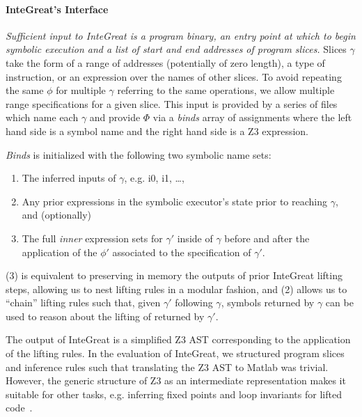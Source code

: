 \paragraph{InteGreat's Interface}

\emph{Sufficient input to InteGreat is a program binary, an entry point at which to begin symbolic execution and a list of start and end addresses of program slices.} 
Slices $\gamma$ take the form of a range of addresses (potentially of zero length), a type of instruction, or an expression over the names of other slices.
To avoid repeating the same $\phi$ for multiple $\gamma$ referring to the same operations, we allow multiple range specifications for a given slice.
This input is provided by a series of files which name each $\gamma$ and provide $\Phi$ via a \emph{binds} array of assignments where the left hand side is a symbol name and the right hand side is a Z3 expression.

\emph{Binds} is initialized with the following two symbolic name sets:
\begin{enumerate}
	\item The inferred inputs of $\gamma$, e.g. i0, i1, \dots,
	\item Any prior expressions in the symbolic executor's state prior to reaching $\gamma$, and (optionally)
	\item The full \emph{inner} expression sets for $\gamma'$ inside of $\gamma$ before and after the application of the $\phi'$ associated to the specification of $\gamma'$.
\end{enumerate}
(3) is equivalent to preserving in memory the outputs of prior InteGreat lifting steps, allowing us to nest lifting rules in a modular fashion, and (2) allows us to ``chain'' lifting rules such that, given $\gamma'$ following $\gamma$, symbols returned by $\gamma$ can be used to reason about the lifting of returned by $\gamma'$.

The output of InteGreat is a simplified Z3 AST corresponding to the application of the lifting rules. 
In the evaluation of InteGreat, we structured program slices and inference rules such that translating the Z3 AST to Matlab was trivial.
However, the generic structure of Z3 as an intermediate representation makes it suitable for other tasks, e.g. inferring fixed points and loop invariants for lifted code~\cite{si2018learning}.



